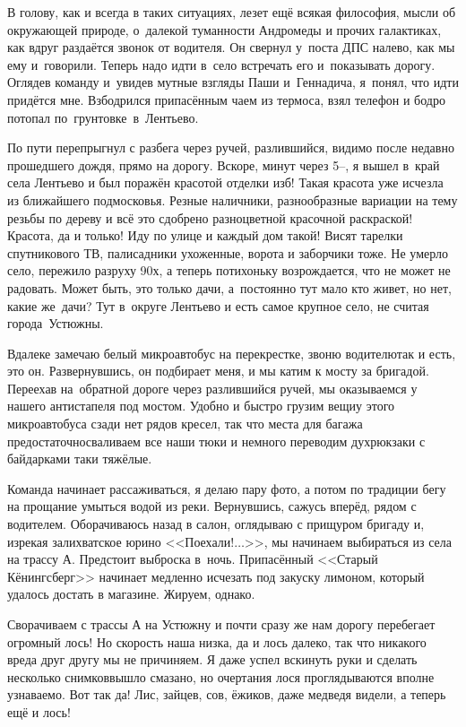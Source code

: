 В голову, как и всегда в таких ситуациях, лезет ещё всякая философия, мысли об окружающей природе, о~далекой туманности Андромеды и прочих галактиках, как вдруг раздаётся звонок от водителя. Он свернул у~поста ДПС налево, как мы ему и~говорили. Теперь надо идти в~село встречать его и~показывать дорогу. Оглядев команду и~увидев мутные взгляды Паши и~Геннадича, я~понял, что идти придётся мне. Взбодрился припасённым чаем из термоса, взял телефон и бодро потопал по~грунтовке~в~Лентьево. 
 
По пути перепрыгнул с разбега через ручей, разлившийся, видимо после недавно прошедшего дождя, прямо на дорогу. Вскоре, минут через 5\thinspace\nobreakdash--, я вышел в~край села Лентьево и был поражён красотой отделки изб! Такая красота уже исчезла из ближайшего подмосковья. Резные наличники, разнообразные вариации на тему резьбы по дереву и всё это сдобрено разноцветной красочной раскраской! Красота, да и только! Иду по улице и каждый дом такой! Висят тарелки спутникового ТВ, палисадники ухоженные, ворота и заборчики тоже. Не умерло село, пережило разруху 90\sdash х, а теперь потихоньку возрождается, что не может не радовать. Может быть, это только дачи, а~постоянно тут мало кто живет, но нет, какие же~дачи? Тут в~округе Лентьево и есть самое крупное село, не считая города~Устюжны.

Вдалеке замечаю белый микроавтобус на перекрестке, звоню водителю\mdash так и есть, это он. Развернувшись, он подбирает меня, и мы катим к мосту за бригадой. Переехав на~обратной дороге через разлившийся ручей, мы оказываемся у нашего антистапеля под мостом. Удобно и быстро грузим вещи\mdash у этого микроавтобуса сзади нет рядов кресел, так что места для багажа предостаточно\mdash сваливаем все наши тюки и немного переводим дух\mdash рюкзаки с байдарками таки тяжёлые. 

Команда начинает рассаживаться, я делаю пару фото, а потом по традиции бегу на прощание умыться водой из реки. Вернувшись, сажусь вперёд, рядом с водителем. Оборачиваюсь назад в салон, оглядываю с прищуром бригаду и, изрекая залихватское юрино <<Поехали!$\ldots$>>, мы начинаем выбираться из села на трассу А. Предстоит выброска в~ночь. Припасённый <<Старый Кёнингсберг>> начинает медленно исчезать под закуску лимоном, который удалось достать в магазине. Жируем, однако.

Сворачиваем с трассы А на Устюжну и почти сразу же нам дорогу перебегает огромный лось! Но скорость наша низка, да и лось далеко, так что никакого вреда друг другу мы не причиняем. Я даже успел вскинуть руки и сделать несколько снимков\mdash вышло смазано, но очертания лося проглядываются вполне узнаваемо. Вот так да! Лис, зайцев, сов, ёжиков, даже медведя видели, а теперь ещё и лось! 

